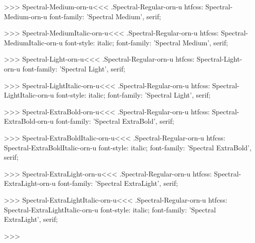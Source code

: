 >>>
\<Spectral-Medium-orn-u\><<<
.Spectral-Regular-orn-u
htfcss:  Spectral-Medium-orn-u  font-family: 'Spectral Medium', serif;

>>>
\<Spectral-MediumItalic-orn-u\><<<
.Spectral-Regular-orn-u
htfcss:  Spectral-MediumItalic-orn-u  font-style: italic; font-family: 'Spectral Medium', serif;

>>>
\<Spectral-Light-orn-u\><<<
.Spectral-Regular-orn-u
htfcss:  Spectral-Light-orn-u  font-family: 'Spectral Light', serif;

>>>
\<Spectral-LightItalic-orn-u\><<<
.Spectral-Regular-orn-u
htfcss:  Spectral-LightItalic-orn-u  font-style: italic; font-family: 'Spectral Light', serif;

>>>
\<Spectral-ExtraBold-orn-u\><<<
.Spectral-Regular-orn-u
htfcss:  Spectral-ExtraBold-orn-u  font-family: 'Spectral ExtraBold', serif;

>>>
\<Spectral-ExtraBoldItalic-orn-u\><<<
.Spectral-Regular-orn-u
htfcss:  Spectral-ExtraBoldItalic-orn-u  font-style: italic; font-family: 'Spectral ExtraBold', serif;

>>>
\<Spectral-ExtraLight-orn-u\><<<
.Spectral-Regular-orn-u
htfcss:  Spectral-ExtraLight-orn-u  font-family: 'Spectral ExtraLight', serif;

>>>
\<Spectral-ExtraLightItalic-orn-u\><<<
.Spectral-Regular-orn-u
htfcss:  Spectral-ExtraLightItalic-orn-u  font-style: italic; font-family: 'Spectral ExtraLight', serif;

>>>
\bye

